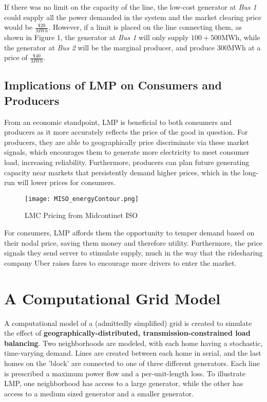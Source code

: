 \documentclass{article}
\begin{document}
If there was no limit on the capacity of the line, the low-cost generator at \emph{Bus 1} could supply all the power demanded in the system and the market clearing price would be $\frac{\$20}{MWh}$. However, if a limit is placed on the line connecting them, as shown in Figure 1, the generator at \emph{Bus 1} will only supply $100 + 500$MWh, while the generator at \emph{Bus 2} will be the marginal producer, and produce 300MWh at a price of $\frac{\$40}{MWh}$. 

\subsection{Implications of LMP on Consumers and Producers}
From an economic standpoint, LMP is beneficial to both consumers and producers as it more accurately reflects the price of the good in question. For producers, they are able to geographically price discriminate via these market signals, which encourages them to generate more electricity to meet consumer load, increasing reliability. Furthermore, producers can plan future generating capacity near markets that persistently demand higher prices, which in the long-run will lower prices for consumers.
\begin{figure}[ht]
	\centering
	\texttt{[image: MISO\_energyContour.png]}
	\caption{LMC Pricing from Midcontinet ISO}
\end{figure}

For consumers, LMP affords them the opportunity to temper demand based on their nodal price, saving them money and therefore utility. Furthermore, the price signals they send server to stimulate supply, much in the way that the ridesharing company Uber raises fares to encourage more drivers to enter the market.

\section{A Computational Grid Model}
A computational model of a (admittedly simplified) grid is created to simulate the effect of \textbf{geographically-distributed, transmission-constrained load balancing}. Two neighborhoods are modeled, with each home having a stochastic, time-varying demand. Lines are created between each home in serial, and the last homes on the 'block' are connected to one of three different generators. Each line is prescribed a maximum power flow and a per-unit-length loss. To illustrate LMP, one neighborhood has access to a large generator, while the other has access to a medium sized generator and a smaller generator. \
\end{document}
